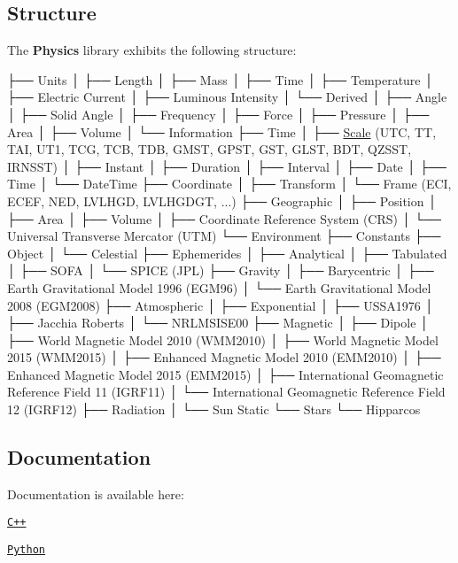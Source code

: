 \subsection*{Structure}

The {\bfseries Physics} library exhibits the following structure\+:


\begin{DoxyCode}
├── Units
│   ├── Length
│   ├── Mass
│   ├── Time
│   ├── Temperature
│   ├── Electric Current
│   ├── Luminous Intensity
│   └── Derived
│       ├── Angle
│       ├── Solid Angle
│       ├── Frequency
│       ├── Force
│       ├── Pressure
│       ├── Area
│       ├── Volume
│       └── Information
├── Time
│   ├── \hyperlink{namespaceostk_1_1physics_1_1time_adf23d37bd8641fb76a0e98ab46a70df7}{Scale} (UTC, TT, TAI, UT1, TCG, TCB, TDB, GMST, GPST, GST, GLST, BDT, QZSST, IRNSST)
│   ├── Instant
│   ├── Duration
│   ├── Interval
│   ├── Date
│   ├── Time
│   └── DateTime
├── Coordinate
│   ├── Transform
│   └── Frame (ECI, ECEF, NED, LVLHGD, LVLHGDGT, ...)
├── Geographic
│   ├── Position
│   ├── Area
│   ├── Volume
│   ├── Coordinate Reference System (CRS)
│   └── Universal Transverse Mercator (UTM)
└── Environment
    ├── Constants
    ├── Object
    │   └── Celestial
    ├── Ephemerides
    │   ├── Analytical
    │   ├── Tabulated
    │   ├── SOFA
    │   └── SPICE (JPL)
    ├── Gravity
    │   ├── Barycentric
    │   ├── Earth Gravitational Model 1996 (EGM96)
    │   └── Earth Gravitational Model 2008 (EGM2008)
    ├── Atmospheric
    │   ├── Exponential
    │   ├── USSA1976
    │   ├── Jacchia Roberts
    │   └── NRLMSISE00
    ├── Magnetic
    │   ├── Dipole
    │   ├── World Magnetic Model 2010 (WMM2010)
    │   ├── World Magnetic Model 2015 (WMM2015)
    │   ├── Enhanced Magnetic Model 2010 (EMM2010)
    │   ├── Enhanced Magnetic Model 2015 (EMM2015)
    │   ├── International Geomagnetic Reference Field 11 (IGRF11)
    │   └── International Geomagnetic Reference Field 12 (IGRF12)
    ├── Radiation
    │   └── Sun Static
    └── Stars
        └── Hipparcos
\end{DoxyCode}


\subsection*{Documentation}

Documentation is available here\+:


\begin{DoxyItemize}
\item \href{https://open-space-collective.github.io/open-space-toolkit-physics}{\tt C++}
\item \href{./bindings/python/docs}{\tt Python}
\end{DoxyItemize}

